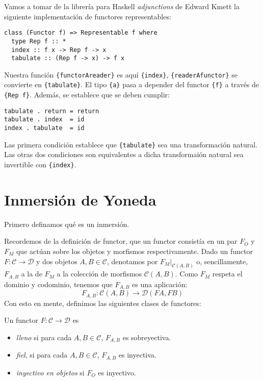 \documentclass[12pt, twoside]{book}
\newcommand{\code}[1]{\Verb+{#1}+}
\newcommand{\cat}{{\mathcal{C}}}
\begin{document}
Vamos a tomar de la librería para Haskell \textit{adjunctions} de Edward Kmett la siguiente implementación de functores representables:
\begin{verbatim}
class (Functor f) => Representable f where
  type Rep f :: *
  index :: f x -> Rep f -> x
  tabulate :: (Rep f -> x) -> f x
\end{verbatim}
Nuestra función \code{functorAreader} es aquí \code{index}, \code{readerAfunctor} se convierte en \code{tabulate}.
El tipo \code{a} pasa a depender del functor \code{f} a través de \code{Rep f}.
Además, se establece que se deben cumplir:
\begin{verbatim}
tabulate . return = return
tabulate . index  = id
index . tabulate  = id
\end{verbatim}
Las primera condición establece que \code{tabulate} sea una transformación natural. 
Las otras dos condiciones son equivalentes a dicha transformaión natural sea invertible con \code{index}.

\section{Inmersión de Yoneda}
Primero definamos qué es un inmersión.

Recordemos de la definición de functor, que un functor consistía en un par $F_O$ y $F_M$ que actúan sobre los objetos y morfismos respectivamente.
Dado un functor $F \colon \cat \to \mathcal{D}$ y dos objetos $A, B \in \cat$, denotamos por $F_M|_{\cat(A,B)}$ o, sencillamente, $F_{A,B}$ a la  de $F_M$ a la colección de morfismos $\cat(A,B)$.
Como $F_M$ respeta el dominio y codominio, tenemos que $F_{A,B}$ es una aplicación:
\[ F_{A,B} \colon \cat(A,B) \to \mathcal{D}(F A, F B) \]
Con esto en mente, definimos las siguientes clases de functores:

\begin{definition}
Un functor $F \colon \cat \to \mathcal{D}$ es 
\begin{itemize}
  \item {}\emph{lleno} si para cada $A,B \in \cat$, $F_{A,B}$ es sobreyectiva.
  \item {}\emph{fiel}, si para cada $A,B \in \cat$, $F_{A,B}$ es inyectiva.
  \item {}\emph{inyectivo en objetos} si $F_O$ es inyectivo.
\end{itemize}
\end{definition}
\end{document}
